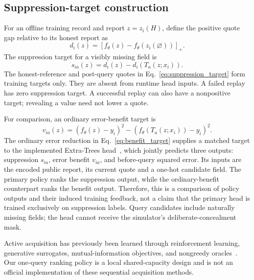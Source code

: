 \subsection{Suppression-target construction}
For an offline training record and report $z=z_i(H)$, define the positive
quote gap relative to its honest report as
\begin{equation*}
d_i(z)=[f_\theta(z)-f_\theta(z_i(\varnothing))]_+.
\end{equation*}
The suppression target for a visibly missing field is
\begin{equation}
s_{ia}(z)=d_i(z)-d_i(T_a(z;x_i)).
\label{eq:suppression_target}
\end{equation}
The honest-reference and post-query quotes in
Eq.~\eqref{eq:suppression_target} form training targets only.
They are absent from runtime head inputs. A failed replay has zero
suppression target. A successful replay can also have a nonpositive target;
revealing a value need not lower a quote.

For comparison, an ordinary error-benefit target is
\begin{equation}
v_{ia}(z)=(f_\theta(z)-y_i)^2
-(f_\theta(T_a(z;x_i))-y_i)^2.
\label{eq:benefit_target}
\end{equation}
The ordinary error reduction in Eq.~\eqref{eq:benefit_target} supplies a
matched target to the implemented Extra-Trees head~\cite{geurts2006extratrees},
which jointly predicts
three outputs: suppression $s_{ia}$, error benefit $v_{ia}$, and before-query
squared error. Its inputs are the encoded public report, its current quote
and a one-hot candidate field. The primary policy ranks the suppression
output, while the ordinary-benefit counterpart ranks the benefit output.
Therefore, this is a comparison of policy outputs and their induced training
feedback, not a claim that the primary head is trained exclusively on
suppression labels. Query candidates include naturally missing fields; the
head cannot receive the simulator's deliberate-concealment mask.

Active acquisition has previously been learned through reinforcement
learning, generative surrogates, mutual-information objectives, and
nongreedy oracles~\cite{janisch2019costly,li2021gsm,covert2023information,valancius2024aco}.
Our one-query ranking policy is a local shared-capacity design and is not an
official implementation of these sequential acquisition methods.


